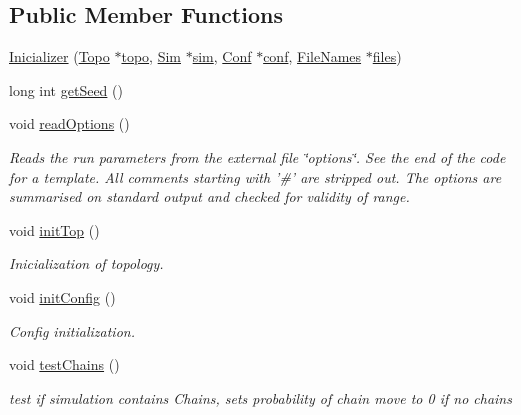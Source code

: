 \subsection*{Public Member Functions}
\begin{DoxyCompactItemize}
\item 
\hyperlink{class_inicializer_aebd47082aeb8e42a1f44edd8a9844fa1}{Inicializer} (\hyperlink{struct_topo}{Topo} $\ast$\hyperlink{class_inicializer_a9ce346ffecd5ecf76bd4c1c68a3060f7}{topo}, \hyperlink{struct_sim}{Sim} $\ast$\hyperlink{class_inicializer_a8d55514c1121c5d3edbbd4fdfb32db65}{sim}, \hyperlink{class_conf}{Conf} $\ast$\hyperlink{class_inicializer_a6a3bb727f3ad6db5c667f615596cd5e4}{conf}, \hyperlink{struct_file_names}{File\+Names} $\ast$\hyperlink{class_inicializer_aecd4b4dcea44e06dd58000db4144e93e}{files})
\item 
long int \hyperlink{class_inicializer_a8cc93243d56aa21def8f073739f63ad4}{get\+Seed} ()
\item 
void \hyperlink{class_inicializer_a41ac3793bca326b7b0d47c342bebf7b4}{read\+Options} ()
\begin{DoxyCompactList}\small\item\em Reads the run parameters from the external file \char`\"{}options\char`\"{}. See the end of the code for a template. All comments starting with '\#' are stripped out. The options are summarised on standard output and checked for validity of range. \end{DoxyCompactList}\item 
void \hyperlink{class_inicializer_a7e1409d66a770fb50bcd90d96446a917}{init\+Top} ()
\begin{DoxyCompactList}\small\item\em Inicialization of topology. \end{DoxyCompactList}\item 
void \hyperlink{class_inicializer_a03369c6bc8655d42befd4c79f4f02301}{init\+Config} ()
\begin{DoxyCompactList}\small\item\em Config initialization. \end{DoxyCompactList}\item 
void \hyperlink{class_inicializer_a228deba06743d06562179c7f85b958ad}{test\+Chains} ()
\begin{DoxyCompactList}\small\item\em test if simulation contains Chains, sets probability of chain move to 0 if no chains \end{DoxyCompactList}\item 

\end{DoxyCompactItemize}
